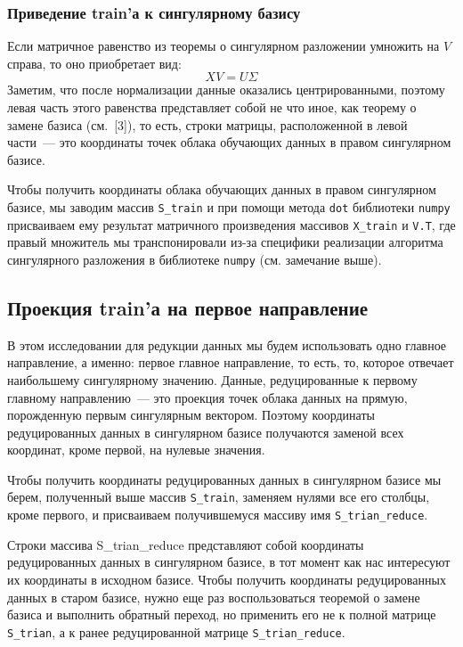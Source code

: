 \documentclass[a4paper,12pt]{article}
\begin{document}
\subsubsection{Приведение train'а к сингулярному базису}

Если матричное равенство из теоремы о сингулярном разложении умножить на $V$ справа, то оно приобретает вид:
$$
XV = U\Sigma
$$
Заметим, что после нормализации данные оказались центрированными, поэтому левая часть этого равенства представляет собой не что иное, как теорему о замене базиса (см. [3]), то есть, строки матрицы, расположенной в левой части — это координаты точек облака обучающих данных в правом сингулярном базисе.  

Чтобы получить координаты облака обучающих данных в правом сингулярном базисе, мы заводим массив \texttt{S\_train} и при помощи метода \texttt{dot} библиотеки \texttt{numpy} присваиваем ему результат матричного произведения массивов \texttt{X\_train} и \texttt{V.T}, где правый множитель мы транспонировали из-за специфики реализации алгоритма сингулярного разложения в библиотеке \texttt{numpy} (см. замечание выше).

\subsection{Проекция train'а на первое направление}
В этом исследовании для редукции данных мы будем использовать одно главное направление, а именно: первое главное направление, то есть, то, которое отвечает наибольшему сингулярному значению. Данные, редуцированные к первому главному направлению — это проекция точек облака данных на прямую, порожденную первым сингулярным вектором. Поэтому координаты редуцированных данных в сингулярном базисе получаются заменой всех координат, кроме первой, на нулевые значения.

Чтобы получить координаты редуцированных данных в сингулярном базисе мы берем, полученный выше массив \texttt{S\_train}, заменяем нулями все его столбцы, кроме первого, и  присваиваем получившемуся массиву имя \texttt{S\_trian\_reduce}.

Строки массива S\_trian\_reduce представляют собой координаты редуцированных данных в сингулярном базисе, в тот момент как нас интересуют их координаты в исходном базисе. Чтобы получить координаты редуцированных данных в старом базисе, нужно еще раз воспользоваться теоремой о замене базиса и выполнить обратный переход, но применить его не к полной матрице \texttt{S\_trian}, а к ранее  редуцированной матрице \texttt{S\_trian\_reduce}.
\end{document}
